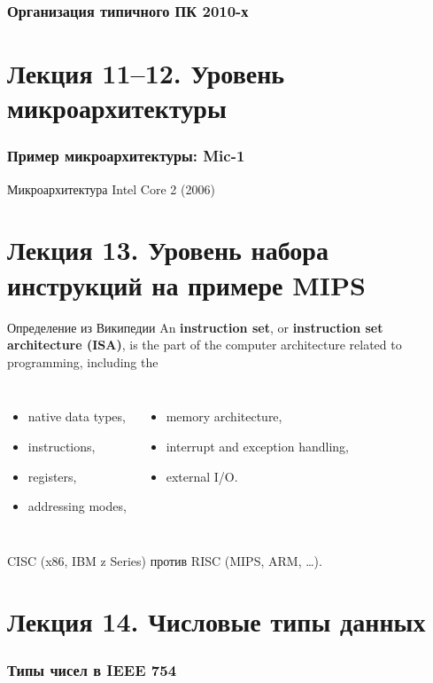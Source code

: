 \begin{frame}[plain]
\frametitle{Организация типичного ПК 2010-х}
\end{frame}


\section{Лекция 11–12.  Уровень микроархитектуры}
\begin{frame}
\frametitle{Пример микроархитектуры: Mic-1}
\vspace{-.3cm}
\end{frame}

\begin{frame}[plain]{Микроархитектура Intel Core 2 (2006)}
\end{frame}

\section[Уровень набора инструкций]{Лекция 13. Уровень набора инструкций на примере MIPS}
\begin{frame}
\begin{block}{Определение из Википедии}
An \textbf{instruction set}, or \textbf{instruction set architecture (ISA)}, is the part of the computer architecture \alert{related to programming}, including the
\begin{columns}
    \column{6cm}
\begin{itemize}
    \item native data types,
    \item instructions,
    \item registers,
    \item addressing modes,
\end{itemize}
    \column{6cm}
\begin{itemize}
    \item memory architecture,
    \item interrupt and exception handling,
    \item external I/O.
\end{itemize}
\end{columns}
\end{block}

\pause CISC (x86, IBM z Series) против RISC (MIPS, ARM, …).
\end{frame}

\section{Лекция 14. Числовые типы данных}
\begin{frame}
\frametitle{Типы чисел в IEEE 754}
\end{frame}

